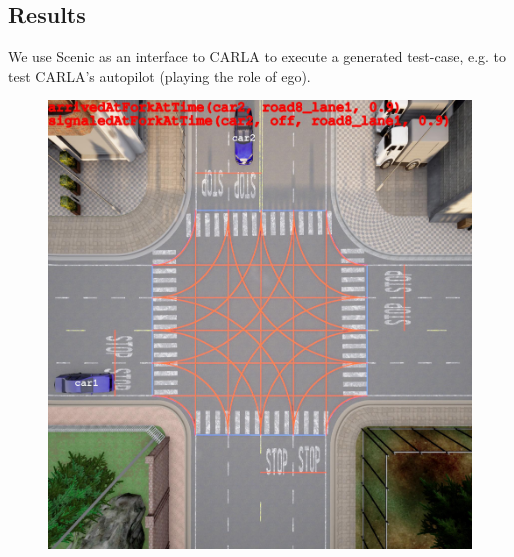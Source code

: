 \subsection{Results}
We use Scenic \cite{Fremont.2020} as an interface to CARLA to execute a generated test-case, e.g. to test CARLA's autopilot (playing the role of ego).


\begin{figure}[ht]%
  \centering
  \begin{minipage}[t]{.499\linewidth}
    {\includegraphics[width=\linewidth]{figures/chapter4/2_18.jpg}}%
  \end{minipage}%
  \hfill
  \begin{minipage}[t]{.499\linewidth}

\end{minipage}
\end{figure}
